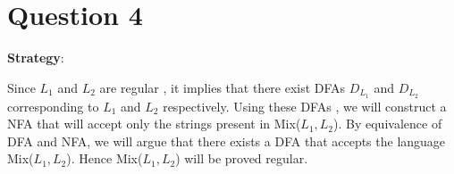 \documentclass[12pt,a4paper]{article}
\begin{document}
\section{Question 4}



\textbf{Strategy}:

Since $L_1$ and $L_2$ are regular , it implies that there exist DFAs $D_{L_1}$ and $D_{L_2}$ corresponding to $L_1$ and $L_2$ respectively. Using these DFAs , we will construct a NFA that will accept only the strings present in Mix($L_1,L_2$). By equivalence of DFA and NFA, we will argue that there exists a DFA that accepts the language Mix($L_1,L_2$). Hence Mix($L_1,L_2$) will be proved regular.
\end{document}
